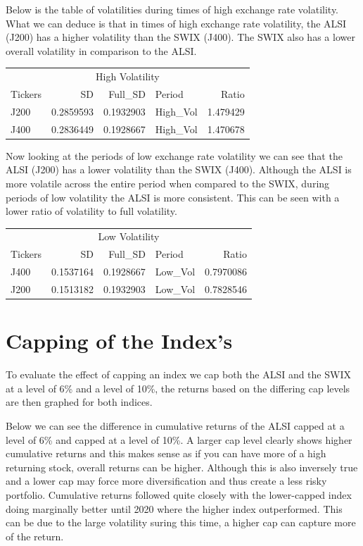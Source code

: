 \documentclass[11pt,preprint, authoryear]{elsarticle}
\numberwithin{equation}{section}
\numberwithin{figure}{section}
\numberwithin{table}{section}
\begin{document}
Below is the table of volatilities during times of high exchange rate
volatility. What we can deduce is that in times of high exchange rate
volatility, the ALSI (J200) has a higher volatility than the SWIX
(J400). The SWIX also has a lower overall volatility in comparison to
the ALSI.

\begin{tabular}{l|r|r|l|r}
\hline
\multicolumn{5}{c}{High Volatility} \\
\cline{1-5}
Tickers & SD & Full\_SD & Period & Ratio\\
\hline
J200 & 0.2859593 & 0.1932903 & High\_Vol & 1.479429\\
\hline
J400 & 0.2836449 & 0.1928667 & High\_Vol & 1.470678\\
\hline
\end{tabular}

Now looking at the periods of low exchange rate volatility we can see
that the ALSI (J200) has a lower volatility than the SWIX (J400).
Although the ALSI is more volatile across the entire period when
compared to the SWIX, during periods of low volatility the ALSI is more
consistent. This can be seen with a lower ratio of volatility to full
volatility.

\begin{tabular}{l|r|r|l|r}
\hline
\multicolumn{5}{c}{Low Volatility} \\
\cline{1-5}
Tickers & SD & Full\_SD & Period & Ratio\\
\hline
J400 & 0.1537164 & 0.1928667 & Low\_Vol & 0.7970086\\
\hline
J200 & 0.1513182 & 0.1932903 & Low\_Vol & 0.7828546\\
\hline
\end{tabular}

\hypertarget{capping-of-the-indexs}{%
\section{Capping of the Index's}\label{capping-of-the-indexs}}

To evaluate the effect of capping an index we cap both the ALSI and the
SWIX at a level of 6\% and a level of 10\%, the returns based on the
differing cap levels are then graphed for both indices.

Below we can see the difference in cumulative returns of the ALSI capped
at a level of 6\% and capped at a level of 10\%. A larger cap level
clearly shows higher cumulative returns and this makes sense as if you
can have more of a high returning stock, overall returns can be higher.
Although this is also inversely true and a lower cap may force more
diversification and thus create a less risky portfolio. Cumulative
returns followed quite closely with the lower-capped index doing
marginally better until 2020 where the higher index outperformed. This
can be due to the large volatility suring this time, a higher cap can
capture more of the return.
\end{document}

